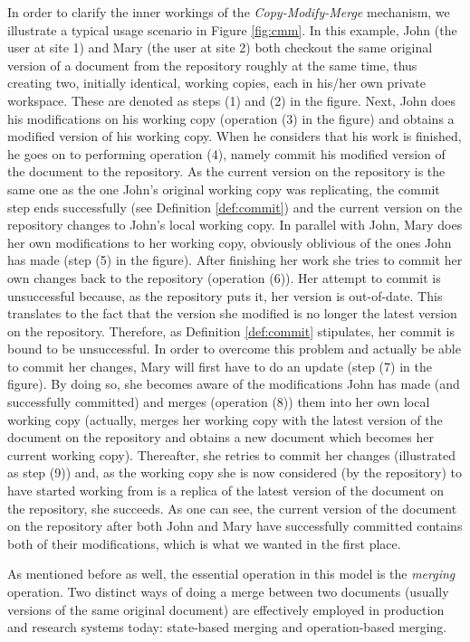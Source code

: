 In order to clarify the inner workings of the \emph{Copy-Modify-Merge} mechanism, we illustrate
a typical usage scenario in Figure \ref{fig:cmm}. In this example, John (the user at site 1) and
Mary (the user at site 2) both checkout the same original version of a document from the repository
roughly at the same time, thus creating two, initially identical, working copies, each in his/her own
private workspace. These are denoted as steps (1) and (2) in the figure. Next, John does his
modifications on his working copy (operation (3) in the figure) and obtains a modified
version of his working copy. When he considers that his work is finished, he goes on to performing
operation (4), namely commit his modified version of the document to the repository. As the
current version on the repository is the same one as the one John's original working copy was
replicating, the commit step ends successfully (see Definition \ref{def:commit}) and the current
version on the repository changes to John's local working copy. In parallel with John,
Mary does her own modifications to her working copy, obviously oblivious of the ones John has
made (step (5) in the figure). After finishing her work she tries to commit her own changes
back to the repository (operation (6)). Her attempt to commit is unsuccessful because, as
the repository puts it, her version is out-of-date. This translates to the fact that the
version she modified is no longer the latest version on the repository. Therefore, as
Definition \ref{def:commit} stipulates, her commit is bound to be unsuccessful. In order to
overcome this problem and actually be able to commit her changes, Mary will first have to do an
update (step (7) in the figure). By doing so, she becomes aware of the modifications John has
made (and successfully committed) and merges (operation (8)) them into her own local working
copy (actually, merges her working copy with the latest version of the document on the repository
and obtains a new document which becomes her current working copy). Thereafter, she retries to
commit her changes (illustrated as step (9)) and, as the working copy she is now considered (by
the repository) to have started working from is a replica of the latest version of the
document on the repository, she succeeds. As one can see, the current version of the document
on the repository after both John and Mary have successfully committed contains both of their
modifications, which is what we wanted in the first place.

As mentioned before as well, the essential operation in this model is the \emph{merging}
operation. Two distinct ways of doing a merge between two documents (usually versions of
the same original document) are effectively employed in production and research
systems today: state-based merging and operation-based merging.

